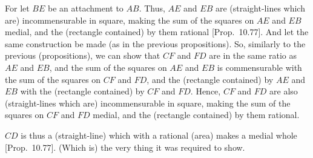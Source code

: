 \begin{Parallel}{}{}
{For let $BE$ be an attachment to $AB$. Thus, $AE$ and
$EB$ are (straight-lines which are) incommensurable in square, making the sum of the
squares on $AE$ and $EB$ medial,  and the (rectangle contained)
by them rational [Prop.~10.77]. 
And let the same construction be made (as in the previous propositions).
So, similarly
to the previous  (propositions), we can  show that $CF$ and $FD$
are in the same ratio as $AE$ and $EB$, and the sum of the squares
on $AE$ and $EB$ is commensurable with the sum of the squares on
$CF$ and $FD$, and the (rectangle contained) by $AE$ and $EB$
with the (rectangle contained) by $CF$ and $FD$. Hence, $CF$ and
$FD$ are also (straight-lines which are) incommensurable in square, making the sum of the
squares on $CF$ and $FD$ medial, and the (rectangle contained) by them
rational.

\epsfysize=0.7in
\centerline{}

$CD$ is thus a (straight-line) which with a rational (area) makes a
medial whole [Prop.~10.77]. (Which is)
the very thing it was required to show.}
\end{Parallel}

